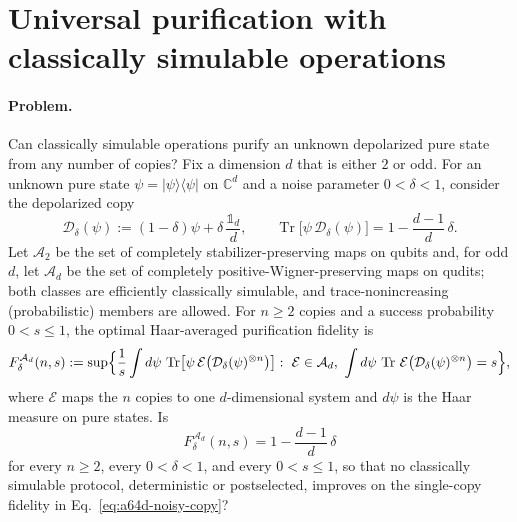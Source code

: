\section{Universal purification with classically simulable operations}
\label{sec:op_a64dc63d6ae49127}

\paragraph{Problem.}
Can classically simulable operations purify an unknown depolarized pure
state from any number of copies?  Fix a dimension $d$ that is either $2$
or odd.  For an unknown pure state $\psi=|\psi\rangle\langle\psi|$ on
$\mathbb C^d$ and a noise parameter $0<\delta<1$, consider the depolarized
copy
\begin{equation}
  \mathcal D_\delta(\psi):=(1-\delta)\psi+\delta\,\frac{\mathbb 1_d}{d},
  \qquad
  \operatorname{Tr}\bigl[\psi\,\mathcal D_\delta(\psi)\bigr]
  =1-\frac{d-1}{d}\,\delta.
  \label{eq:a64d-noisy-copy}
\end{equation}
Let $\mathcal A_2$ be the set of completely stabilizer-preserving maps on
qubits and, for odd $d$, let $\mathcal A_d$ be the set of completely
positive-Wigner-preserving maps on qudits; both classes are efficiently
classically simulable, and trace-nonincreasing (probabilistic) members are
allowed.  For $n\geq2$ copies and a success probability $0<s\leq1$, the
optimal Haar-averaged purification fidelity is
\begin{equation}
  F^{\mathcal A_d}_{\delta}(n,s)
  :=\sup\Bigl\{\frac1s\int d\psi\,
    \operatorname{Tr}\bigl[\psi\,
      \mathcal E\bigl(\mathcal D_\delta(\psi)^{\otimes n}\bigr)\bigr]
    :\ \mathcal E\in\mathcal A_d,\
    \int d\psi\,\operatorname{Tr}\,
      \mathcal E\bigl(\mathcal D_\delta(\psi)^{\otimes n}\bigr)=s
  \Bigr\},
  \label{eq:a64d-fidelity}
\end{equation}
where $\mathcal E$ maps the $n$ copies to one $d$-dimensional system and
$d\psi$ is the Haar measure on pure states.  Is
\begin{equation}
  F^{\mathcal A_d}_{\delta}(n,s)=1-\frac{d-1}{d}\,\delta
  \label{eq:a64d-no-go}
\end{equation}
for every $n\geq2$, every $0<\delta<1$, and every $0<s\leq1$, so that no
classically simulable protocol, deterministic or postselected, improves on
the single-copy fidelity in Eq.~\eqref{eq:a64d-noisy-copy}?

